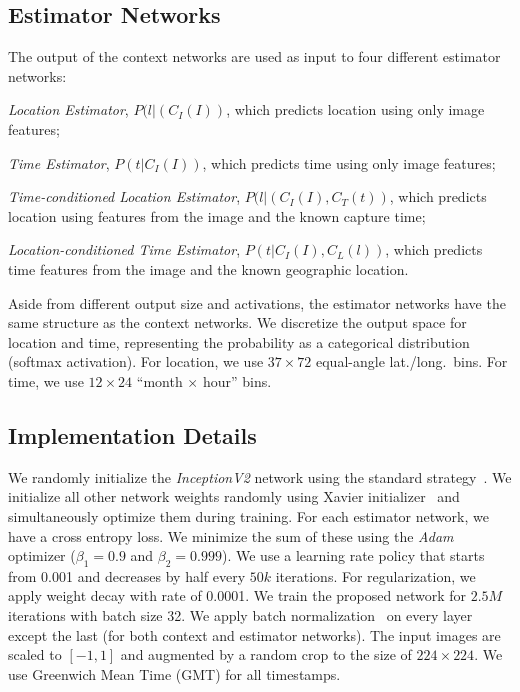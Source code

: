 \documentclass{bmvc2k}
\begin{document}
\subsection{Estimator Networks}

The output of the context networks are used as input to four different
estimator networks:
\begin{compactitem}
  
  \item {\em Location Estimator}, $P(l|(C_I(I))$, which predicts
    location using only image features;

  \item {\em Time Estimator}, $P(t|C_I(I))$, which predicts time using
    only image features; 

  \item {\em Time-conditioned Location Estimator}, $P(l|(C_I(I),C_T(t))$, which predicts
    location using features from the image and the known capture time;

  \item {\em Location-conditioned Time Estimator}, $P(t|C_I(I),C_L(l))$, which
    predicts time features from the image and the known geographic
    location. 

\end{compactitem}
%
Aside from different output size and activations, the estimator
networks have the same structure as the context networks. We
discretize the output space for location and time, representing the
probability as a categorical distribution (softmax activation). For
location, we use $37 \times 72$ equal-angle lat./long.\ bins.  For
time, we use $12 \times 24$ ``month $\times$ hour'' bins.

\subsection{Implementation Details}

We randomly initialize the {\em InceptionV2} network using the
standard strategy~\cite{szegedy2016rethinking}.
We initialize all other network weights randomly using Xavier
initializer~\cite{glorot2010understanding} and
simultaneously optimize them during training. For each
estimator network, we have a cross entropy loss.  We minimize the sum
of these using the {\em Adam} optimizer \cite{kingma2014adam}
($\beta_1 = 0.9$ and $\beta_2 = 0.999$). We use a learning rate policy
that starts from 0.001 and decreases by half every $50k$ iterations.
For regularization, we apply weight decay with rate of 0.0001. We
train the proposed network for $2.5M$ iterations with batch size 32.
We apply batch
normalization~\cite{inception15} on every layer except the last (for
both context and estimator networks).  The input images are scaled to
$[-1,1]$ and augmented by a random crop to the size of $224 \times
224$. We use Greenwich Mean Time (GMT) for all timestamps.
\end{document}
